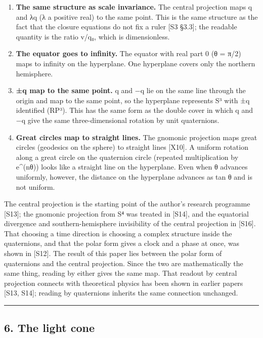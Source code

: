 \documentclass[
  a4paper,
]{article}
\providecommand{\tightlist}{%
  \setlength{\itemsep}{0pt}\setlength{\parskip}{0pt}}
\begin{document}
\begin{enumerate}
\def\labelenumi{\arabic{enumi}.}
\tightlist
\item
  \textbf{The same structure as scale invariance.} The central
  projection maps q and λq (λ a positive real) to the same point. This
  is the same structure as the fact that the closure equations do not
  fix a ruler {[}S3 §3.3{]}; the readable quantity is the ratio v/q₀,
  which is dimensionless.
\item
  \textbf{The equator goes to infinity.} The equator with real part 0 (θ
  = π/2) maps to infinity on the hyperplane. One hyperplane covers only
  the northern hemisphere.
\item
  \textbf{±q map to the same point.} q and −q lie on the same line
  through the origin and map to the same point, so the hyperplane
  represents S³ with ±q identified (RP³). This has the same form as the
  double cover in which q and −q give the same three-dimensional
  rotation by unit quaternions.
\item
  \textbf{Great circles map to straight lines.} The gnomonic projection
  maps great circles (geodesics on the sphere) to straight lines
  {[}X10{]}. A uniform rotation along a great circle on the quaternion
  circle (repeated multiplication by e\^{}(nθ)) looks like a straight
  line on the hyperplane. Even when θ advances uniformly, however, the
  distance on the hyperplane advances as tan θ and is not uniform.
\end{enumerate}

The central projection is the starting point of the author's research
programme {[}S13{]}; the gnomonic projection from S⁴ was treated in
{[}S14{]}, and the equatorial divergence and southern-hemisphere
invisibility of the central projection in {[}S16{]}. That choosing a
time direction is choosing a complex structure inside the quaternions,
and that the polar form gives a clock and a phase at once, was shown in
{[}S12{]}. The result of this paper lies between the polar form of
quaternions and the central projection. Since the two are mathematically
the same thing, reading by either gives the same map. That readout by
central projection connects with theoretical physics has been shown in
earlier papers {[}S13, S14{]}; reading by quaternions inherits the same
connection unchanged.

\begin{center}\rule{0.5\linewidth}{0.5pt}\end{center}

\subsection{6. The light cone}\label{the-light-cone}
\end{document}

